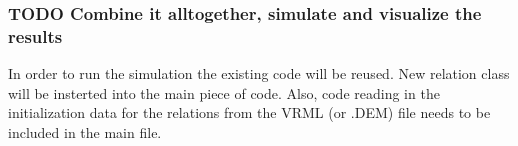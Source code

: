 \documentclass[11pt]{article}
\begin{document}
\subsubsection{\textbf{TODO} Combine it alltogether, simulate and visualize the results}
\label{sec-2.3.3}

    
    In order to run the simulation the existing code will be reused.
    New relation class will be insterted into the main piece of code. Also, code reading in
    the initialization data for the relations from the VRML (or .DEM) file needs to be
    included in the main file.
    
    
\end{document}
